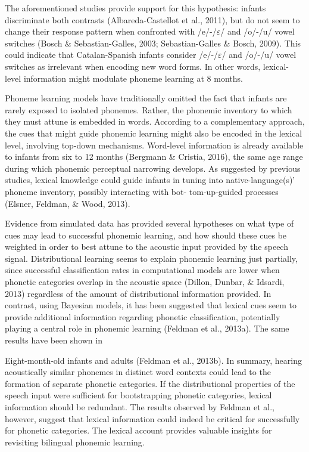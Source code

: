\documentclass[man,floatsintext]{apa6}
\begin{document}
The aforementioned studies provide support for this hypothesis: infants discriminate both contrasts (Albareda-Castellot et al., 2011), but do not seem to change their response pattern when confronted with /e/-/\(\varepsilon\)/ and /o/-/u/ vowel switches (Bosch \& Sebastian-Galles, 2003; Sebastian-Galles \& Bosch, 2009). This could indicate that Catalan-Spanish infants consider /e/-/\(\varepsilon\)/ and /o/-/u/ vowel switches as irrelevant when encoding new word forms. In other words, lexical-level information might modulate phoneme learning at 8 months.

Phoneme learning models have traditionally omitted the fact that infants are rarely exposed to isolated phonemes. Rather, the phonemic inventory to which they must attune is embedded in words. According to a complementary approach, the cues that might guide phonemic learning might also be encoded in the lexical level, involving top-down mechanisms. Word-level information is already available to infants from six to 12 months (Bergmann \& Cristia, 2016), the same age range during which phonemic perceptual narrowing develops. As suggested by previous studies, lexical knowledge could guide infants in tuning into native-language(s)' phoneme inventory, possibly interacting with bot- tom-up-guided processes (Elsner, Feldman, \& Wood, 2013).

Evidence from simulated data has provided several hypotheses on what type of cues may lead to successful phonemic learning, and how should these cues be weighted in order to best attune to the acoustic input provided by the speech signal. Distributional learning seems to explain phonemic learning just partially, since successful classification rates in computational models are lower when phonetic categories overlap in the acoustic space (Dillon, Dunbar, \& Idsardi, 2013) regardless of the amount of distributional information provided. In contrast, using Bayesian models, it has been suggested that lexical cues seem to provide additional information regarding phonetic classification, potentially playing a central role in phonemic learning (Feldman et al., 2013a). The same results have been shown in

Eight-month-old infants and adults (Feldman et al., 2013b). In summary, hearing acoustically similar phonemes in distinct word contexts could lead to the formation of separate phonetic categories. If the distributional properties of the speech input were sufficient for bootstrapping phonetic categories, lexical information should be redundant. The results observed by Feldman et al., however, suggest that lexical information could indeed be critical for successfully for phonetic categories. The lexical account provides valuable insights for revisiting bilingual phonemic learning.
\end{document}
